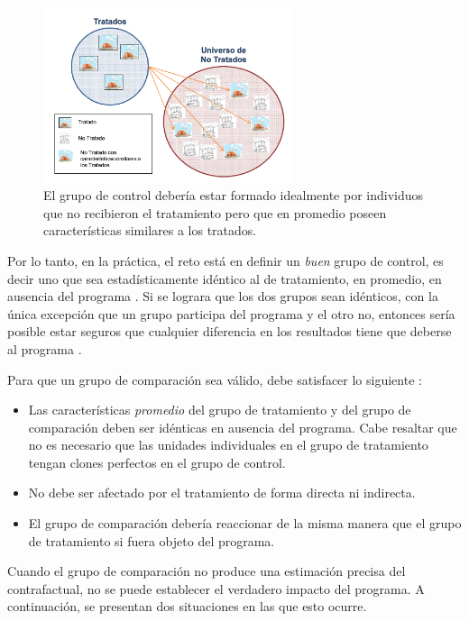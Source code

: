 \documentclass[../../main.tex]{subfiles}
\begin{document}
\begin{figure}[h!]
    \centering
    \includegraphics[width=0.65\textwidth]{figs/grupo-de-control.png}
    \caption{El grupo de control debería estar formado idealmente por individuos que no
    recibieron el tratamiento pero que en promedio poseen características similares a
    los tratados.}
    \label{fig:control-group}
\end{figure}

Por lo tanto, en la práctica, el reto está en definir un \textit{buen} grupo de control,
es decir uno que sea estadísticamente idéntico al de tratamiento, en promedio, en ausencia
del programa \cite{gertler-2016}. Si se lograra que los dos grupos sean idénticos, con la
única excepción que un grupo participa del programa y el otro no, entonces sería posible
estar seguros que cualquier diferencia en los resultados tiene que deberse al programa
\cite{gertler-2016}.

Para que un grupo de comparación sea válido, debe satisfacer lo siguiente \cite{gertler-2016}:
\begin{itemize}
    \item Las características \textit{promedio} del grupo de tratamiento y del grupo de
    comparación deben ser idénticas en ausencia del programa. Cabe resaltar que no es
    necesario que las unidades individuales en el grupo de tratamiento tengan clones
    perfectos en el grupo de control.
    \item No debe ser afectado por el tratamiento de forma directa ni indirecta.
    \item El grupo de comparación debería reaccionar de la misma manera que el grupo de
    tratamiento si fuera objeto del programa.
\end{itemize}

Cuando el grupo de comparación no produce una estimación precisa del contrafactual, no se
puede establecer el verdadero impacto del programa. A continuación, se presentan dos
situaciones en las que esto ocurre.
\end{document}
